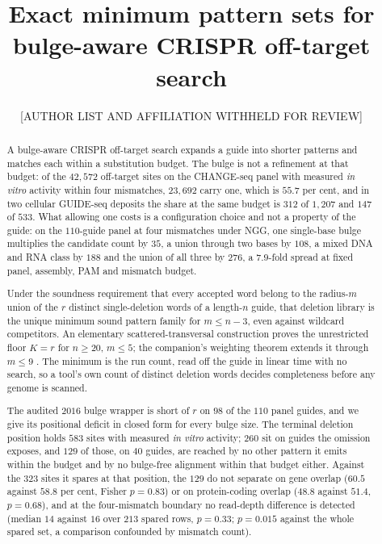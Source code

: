 \documentclass[11pt,letterpaper]{article}
\providecommand{\authorblock}{Amirhossein Daneshpajouh \and Megan Fowler \and Kay C. Wiese\\
  School of Computing Science, Simon Fraser University}
\renewcommand{\authorblock}{\normalsize [AUTHOR LIST AND AFFILIATION WITHHELD FOR REVIEW]}%
\begin{document}
\title{Exact minimum pattern sets for bulge-aware CRISPR off-target search}
\author{\authorblock}
\date{}
\maketitle
\thispagestyle{empty}

\begin{abstract}
A bulge-aware CRISPR off-target search expands a guide into shorter patterns and matches
each within a substitution budget. The bulge is not a refinement at that budget: of the
$42{,}572$ off-target sites on the CHANGE-seq panel with measured \emph{in vitro} activity
within four mismatches, $23{,}692$ carry one, which is $55.7$ per cent, and in two cellular
GUIDE-seq deposits the share at the same budget is $312$ of $1{,}207$ and $147$ of $533$.
What allowing one
costs is a configuration choice and not a property of the guide: on the $110$-guide panel at
four mismatches under NGG, one single-base bulge multiplies the candidate count by $35$, a
union through two bases by $108$, a mixed DNA and RNA class by $188$ and the union of all
three by $276$, a $7.9$-fold spread at fixed panel, assembly, PAM and mismatch budget.

Under the soundness requirement that every accepted word belong to the radius-$m$ union of
the $r$ distinct single-deletion words of a length-$n$ guide, that deletion library is the
unique minimum sound pattern family for $m\le n-3$, even against wildcard competitors. An
elementary scattered-transversal construction proves the unrestricted floor $K=r$ for
$n\ge20$, $m\le5$; the companion's weighting theorem extends it through $m\le9$
\citep{companion_reach}. The minimum is the run count, read off the guide in linear time
with no search, so a tool's own count of distinct deletion words decides completeness
before any genome is scanned.

The audited $2016$ bulge wrapper is short of $r$ on $98$ of the $110$ panel guides, and we
give its positional deficit in closed form for every bulge size. The terminal deletion
position holds $583$ sites with measured \emph{in vitro} activity; $260$ sit on guides the
omission exposes, and
$129$ of those, on $40$ guides, are reached by no other pattern it emits within the budget
and by no bulge-free alignment within that budget either. Against the $323$ sites it spares at that
position, the $129$ do not separate on gene overlap ($60.5$ against $58.8$ per cent, Fisher
$p=0.83$) or on protein-coding overlap ($48.8$ against $51.4$, $p=0.68$), and at the
four-mismatch boundary no read-depth difference is detected (median $14$ against $16$ over
$213$ spared rows, $p=0.33$; $p=0.015$ against the whole spared set, a comparison
confounded by mismatch count).


\end{abstract}
\end{document}
